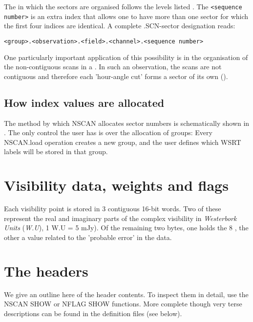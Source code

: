         The  in which the sectors are
organised follows the levels listed . The 
\verb/<sequence number>/ is an extra index that allows one to have more than
one sector for which the first four indices are identical. A complete 
.SCN-sector designation reads: 
\bi 
\item[] \verb/<group>.<observation>.<field>.<channel>.<sequence number>/ 
\ei 

 

        One particularly important application of this possibility is in the
organisation of the non-contiguous scans in a .
In such an observation, the scans are not contiguous and therefore each
'hour-angle cut' forms a sector of its own (). 



\subsection{ How index values are allocated} 
\label{.index.define} 

 

        The method by which NSCAN allocates sector numbers is schematically
shown in . The only control the user has is over the
allocation of groups: Every NSCAN.load operation creates a new group, and the
user defines which WSRT labels will be stored in that group. 



\section{ Visibility data, weights and flags } 

        Each visibility point is stored in 3 contiguous 16-bit words. Two of
these represent the real and imaginary parts of the complex visibility in {\em
Westerbork Units} ({\em W.U}), 1 W.U = 5 mJy). Of the remaining two bytes, one
holds the 8 , the other a  value
related to the 'probable error' in the data. 


\section{ The headers } 

        We give an outline here of the header contents. To inspect them in
detail, use the NSCAN SHOW or NFLAG SHOW functions. More complete though very
terse descriptions can be found in the definition files (see below). 


